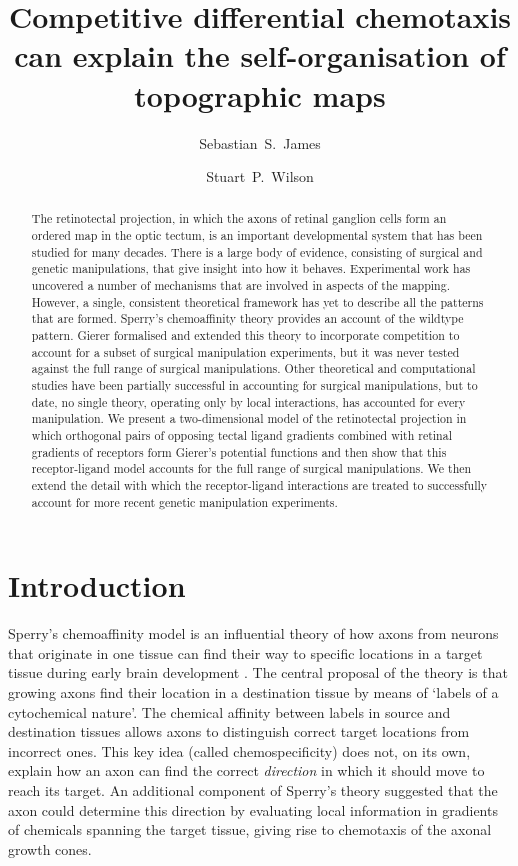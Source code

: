 \documentclass[9pt,lineno]{elife}
\title {
Competitive differential chemotaxis can explain the self-organisation of topographic maps
}
\author[1*]{Sebastian~S.~James}
\author[1]{Stuart~P.~Wilson}
\affil[1]{Department of Psychology, The University of Sheffield, Sheffield, United Kingdom.}
\begin{document}
\maketitle

\begin{abstract}
The retinotectal projection, in which the axons of retinal ganglion cells form an ordered map in the optic tectum, is an important developmental system that has been studied for many decades. There is a large body of evidence, consisting of surgical and genetic manipulations, that give insight into how it behaves. Experimental work has uncovered a number of mechanisms that are involved in aspects of the mapping. However, a single, consistent theoretical framework has yet to describe all the patterns that are formed. Sperry's chemoaffinity theory provides an account of the wildtype pattern. Gierer formalised and extended this theory to incorporate competition to account for a subset of surgical manipulation experiments, but it was never tested against the full range of surgical manipulations. Other theoretical and computational studies have been partially successful in accounting for surgical manipulations, but to date, no single theory, operating only by local interactions, has accounted for every manipulation. We present a two-dimensional model of the retinotectal projection in which orthogonal pairs of opposing tectal ligand gradients combined with retinal gradients of receptors form Gierer's potential functions and then show that this receptor-ligand model accounts for the full range of surgical manipulations. We then extend the detail with which the receptor-ligand interactions are treated to successfully account for more recent genetic manipulation experiments.   
\end{abstract}

\section{Introduction}

Sperry's chemoaffinity model is an influential theory of how axons from neurons that originate in one tissue can find their way to specific locations in a target tissue during early brain development \citep{sperry_reestablishment_1942,sperry_visuomotor_1943,sperry_chemoaffinity_1963}.
%
The central proposal of the theory is that growing axons find their location in a destination tissue by means of `labels of a cytochemical nature'. 
The chemical affinity between labels in source and destination tissues allows axons to distinguish correct target locations from incorrect ones. 
%
This key idea (called chemospecificity) does not, on its own, explain how an axon can find the correct \emph{direction} in which it should move to reach its target.  
An additional component of Sperry's theory \citep{stevens_handbook_1950,sperry_problems_1955,sperry_chemoaffinity_1963} suggested that the axon could determine this direction by evaluating local information in gradients of chemicals spanning the target tissue, giving rise to chemotaxis of the axonal growth cones.
\end{document}
